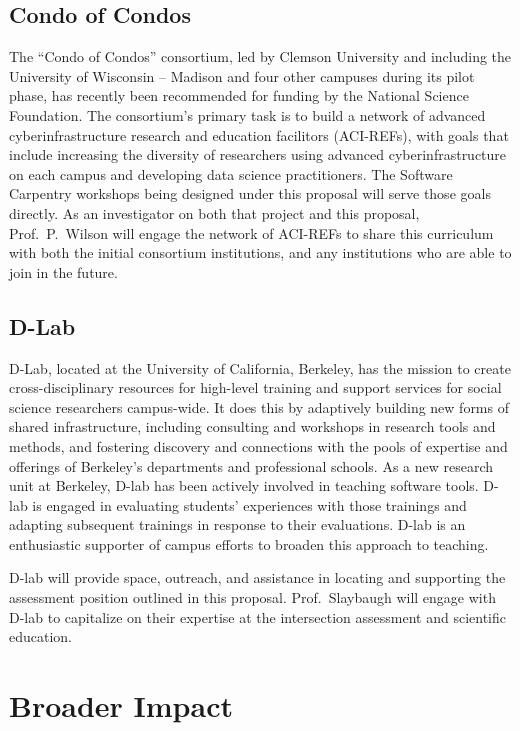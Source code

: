 \documentclass{proposalnsf}
\newlength{\up}
\begin{document}
\subsection{Condo of Condos}
\label{sec:CofC}

The ``Condo of Condos'' consortium, led by Clemson University and
including the University of Wisconsin -- Madison and four other
campuses during its pilot phase, has recently been recommended for
funding by the National Science Foundation.  The consortium's primary
task is to build a network of advanced cyberinfrastructure research
and education facilitors (ACI-REFs), with goals that include
increasing the diversity of researchers using advanced
cyberinfrastructure on each campus and developing data science
practitioners.  The Software Carpentry workshops being designed under
this proposal will serve those goals directly.  As an investigator on
both that project and this proposal, Prof.\ P.\ Wilson will engage the
network of ACI-REFs to share this curriculum with both the initial
consortium institutions, and any institutions who are able to join in
the future.

\subsection{D-Lab}
\label{sec:dlab}

D-Lab, located at the University of California, Berkeley, has the mission to create cross-disciplinary resources for high-level training and support services for social science researchers campus-wide. It does this by adaptively building new forms of shared infrastructure, including consulting and workshops in research tools and methods, and fostering discovery and connections with the pools of expertise and offerings of Berkeley's departments and professional schools. As a new research unit at Berkeley, D-lab has been actively involved in teaching software tools. D-lab is engaged in evaluating students’ experiences with those trainings and adapting subsequent trainings in response to their evaluations. D-lab is an enthusiastic supporter of campus efforts to broaden this approach to teaching.

D-lab will provide space, outreach, and assistance in locating and supporting the assessment position outlined in this proposal. Prof.\ Slaybaugh will engage with D-lab to capitalize on their expertise at the intersection assessment and scientific education. 

\section{Broader Impact}
\end{document}
